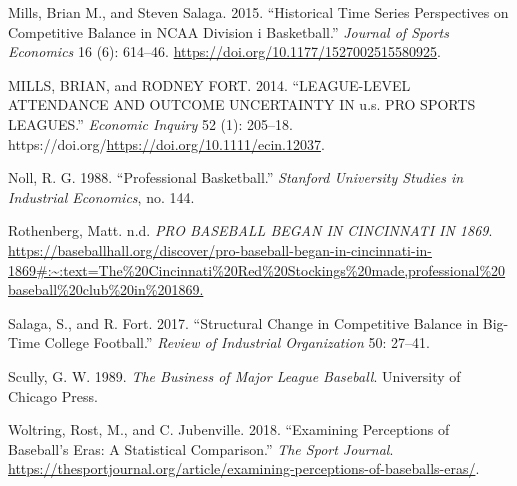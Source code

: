 \documentclass[
  12pt,
]{article}
\newlength{\cslhangindent}
\newlength{\cslentryspacingunit} %
\newenvironment{CSLReferences}[2] %
 {%
  \setlength{\parindent}{0pt}
  \ifodd #1
  \let\oldpar\par
  \def\par{\hangindent=\cslhangindent\oldpar}
  \fi
  \setlength{\parskip}{#2\cslentryspacingunit}
 }%
 {}
\begin{document}
\begin{CSLReferences}{1}{0}
\leavevmode{}%
Mills, Brian M., and Steven Salaga. 2015. {``Historical Time Series
Perspectives on Competitive Balance in NCAA Division i Basketball.''}
\emph{Journal of Sports Economics} 16 (6): 614--46.
\url{https://doi.org/10.1177/1527002515580925}.

\leavevmode{}%
MILLS, BRIAN, and RODNEY FORT. 2014. {``LEAGUE-LEVEL ATTENDANCE AND
OUTCOME UNCERTAINTY IN u.s. PRO SPORTS LEAGUES.''} \emph{Economic
Inquiry} 52 (1): 205--18.
https://doi.org/\url{https://doi.org/10.1111/ecin.12037}.

\leavevmode{}%
Noll, R. G. 1988. {``Professional Basketball.''} \emph{Stanford
University Studies in Industrial Economics}, no. 144.

\leavevmode{}%
Rothenberg, Matt. n.d. \emph{PRO BASEBALL BEGAN IN CINCINNATI IN 1869}.
\url{https://baseballhall.org/discover/pro-baseball-began-in-cincinnati-in-1869\#:~:text=The\%20Cincinnati\%20Red\%20Stockings\%20made,professional\%20baseball\%20club\%20in\%201869.}

\leavevmode{}%
Salaga, S., and R. Fort. 2017. {``Structural Change in Competitive
Balance in Big-Time College Football.''} \emph{Review of Industrial
Organization} 50: 27--41.

\leavevmode{}%
Scully, G. W. 1989. \emph{The Business of Major League Baseball}.
University of Chicago Press.

\leavevmode{}%
Woltring, Rost, M., and C. Jubenville. 2018. {``Examining Perceptions of
Baseball's Eras: A Statistical Comparison.''} \emph{The Sport Journal}.
\url{https://thesportjournal.org/article/examining-perceptions-of-baseballs-eras/}.

\end{CSLReferences}
\end{document}
